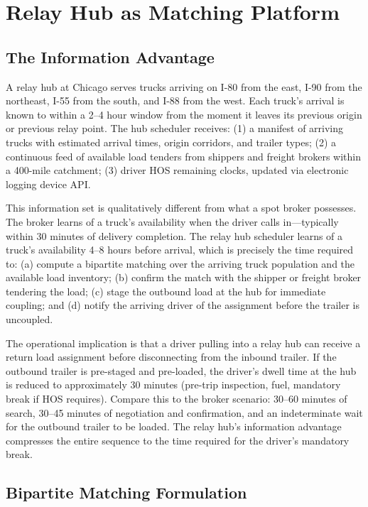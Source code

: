 \section{Relay Hub as Matching Platform}
\label{sec:platform}

\subsection{The Information Advantage}

A relay hub at Chicago serves trucks arriving on I-80 from the east, I-90 from the northeast, I-55 from the south, and I-88 from the west. Each truck's arrival is known to within a 2--4 hour window from the moment it leaves its previous origin or previous relay point. The hub scheduler receives: (1) a manifest of arriving trucks with estimated arrival times, origin corridors, and trailer types; (2) a continuous feed of available load tenders from shippers and freight brokers within a 400-mile catchment; (3) driver HOS remaining clocks, updated via electronic logging device API.

This information set is qualitatively different from what a spot broker possesses. The broker learns of a truck's availability when the driver calls in---typically within 30 minutes of delivery completion. The relay hub scheduler learns of a truck's availability 4--8 hours before arrival, which is precisely the time required to: (a) compute a bipartite matching over the arriving truck population and the available load inventory; (b) confirm the match with the shipper or freight broker tendering the load; (c) stage the outbound load at the hub for immediate coupling; and (d) notify the arriving driver of the assignment before the trailer is uncoupled.

The operational implication is that a driver pulling into a relay hub can receive a return load assignment before disconnecting from the inbound trailer. If the outbound trailer is pre-staged and pre-loaded, the driver's dwell time at the hub is reduced to approximately 30 minutes (pre-trip inspection, fuel, mandatory break if HOS requires). Compare this to the broker scenario: 30--60 minutes of search, 30--45 minutes of negotiation and confirmation, and an indeterminate wait for the outbound trailer to be loaded. The relay hub's information advantage compresses the entire sequence to the time required for the driver's mandatory break.

\subsection{Bipartite Matching Formulation}

